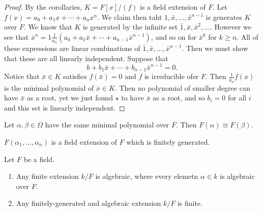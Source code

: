 \begin{proof}
By the corollaries, $K = F[x]/(f)$ is a field extension of $F$. Let $f(x) = a_0 + a_1x + \cdots + a_nx^n$. We claim then taht $1, \bar{x}, \dotsc, \bar{x}^{n-1}$ is generates $K$ over $F$. We know that $K$ is generated by the infinite set $\bar{1}, \bar{x}, \bar{x}^2,\dotsc$. However we see that $\bar{x}^n = 1\frac{1}{a_n}(a_0 + a_1\bar{x} + \cdots + a_{n-1}\bar{x}^{n-1})$, and so on for $\bar{x}^{k}$ for $k \geq n$. All of these expressions are linear combinations of $\bar{1}, \bar{x}, \dotsc, \bar{x}^{n-1}$. Then we must show that these are all linearly independent. Suppose that 
\[b + b_1\bar{x} + \cdots + b_{n-1}\bar{x}^{n-1} = 0.  \]
Notice that $\bar{x} \in K$ satisfies $f(\bar{x}) = 0$ and $f$ is irreducible ofer $F$. Then $\frac{1}{a_n}f(x)$ is the minimal polynomial of $\bar{x} \in K$. Then no polynomial of smaller degree can have $\bar{x}$ as a root, yet we just found $\star$ to have $\bar{x}$ as a root, and so $b_i = 0$ for all $i$ and this set is linearly independent.
\end{proof}

\begin{corollary}
Let $\alpha, \beta \in \Omega$ have the same minimal polynomial over $F$. Then $F(\alpha) \cong F(\beta)$.
\end{corollary}

\begin{definition}
$F(\alpha_1, \dotsc, \alpha_n)$ is a field extension of $F$ which is finitely generated.
\end{definition}

\begin{theorem}
Let $F$ be a field.
\begin{enumerate}
\item Any finite extension $k/F$ is algebraic, where every elemetn $\alpha \in k$ is algebraic over $F$.
\item Any finitely-generated and algebraic extension $k/F$ is finite.
\end{enumerate}
\end{theorem}